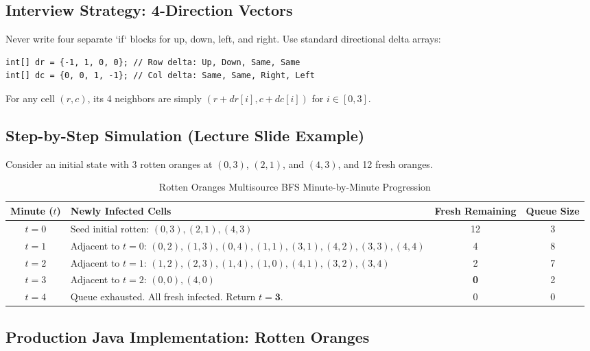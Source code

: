 \documentclass[10pt,journal,compsoc,onecolumn]{IEEEtran}
\begin{document}
\subsection{Interview Strategy: 4-Direction Vectors}

Never write four separate `if` blocks for up, down, left, and right. Use standard directional delta arrays:
\begin{verbatim}
int[] dr = {-1, 1, 0, 0}; // Row delta: Up, Down, Same, Same
int[] dc = {0, 0, 1, -1}; // Col delta: Same, Same, Right, Left
\end{verbatim}
For any cell $(r, c)$, its 4 neighbors are simply $(r + dr[i], c + dc[i])$ for $i \in [0, 3]$.

\subsection{Step-by-Step Simulation (Lecture Slide Example)}

Consider an initial state with 3 rotten oranges at $(0, 3)$, $(2, 1)$, and $(4, 3)$, and 12 fresh oranges.

\begin{table}[htbp]
\caption{Rotten Oranges Multisource BFS Minute-by-Minute Progression}
\label{tab:rotten_sim}
\centering
\begin{tabular}{clcc}
\toprule
\textbf{Minute ($t$)} & \textbf{Newly Infected Cells} & \textbf{Fresh Remaining} & \textbf{Queue Size} \\
\midrule
$t = 0$ & Seed initial rotten: $(0,3), (2,1), (4,3)$ & 12 & 3 \\
$t = 1$ & Adjacent to $t=0$: $(0,2), (1,3), (0,4), (1,1), (3,1), (4,2), (3,3), (4,4)$ & 4 & 8 \\
$t = 2$ & Adjacent to $t=1$: $(1,2), (2,3), (1,4), (1,0), (4,1), (3,2), (3,4)$ & 2 & 7 \\
$t = 3$ & Adjacent to $t=2$: $(0,0), (4,0)$ & \textbf{0} & 2 \\
$t = 4$ & Queue exhausted. All fresh infected. Return $t = \mathbf{3}$. & 0 & 0 \\
\bottomrule
\end{tabular}
\end{table}

\subsection{Production Java Implementation: Rotten Oranges}
\end{document}
